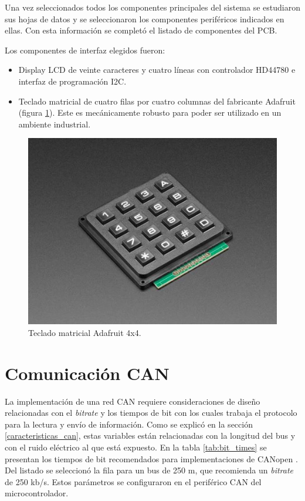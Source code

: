 Una vez seleccionados todos los componentes principales del sistema se estudiaron sus hojas de datos y se seleccionaron los componentes periféricos indicados en ellas. Con esta información se completó el listado de componentes del PCB.

Los componentes de interfaz elegidos fueron:
\begin{itemize}
	\item Display LCD de veinte caracteres y cuatro líneas con controlador HD44780 e interfaz de programación I2C. 
	\item Teclado matricial de cuatro filas por cuatro columnas del fabricante Adafruit \citep{web_adafruit} (figura \ref{fig:keypad}). Este es mecánicamente robusto para poder ser utilizado en un ambiente industrial. 
\end{itemize}

\begin{figure}[htbp]
	\centering
	\includegraphics[scale=.8]{./Figures/keypad.JPG}
	\caption{Teclado matricial Adafruit 4x4.}
	\label{fig:keypad}
\end{figure}



\section{Comunicación CAN}
\label{comunicacion_can}

La implementación de una red CAN requiere consideraciones de diseño relacionadas con el \textit{bitrate} y los tiempos de bit con los cuales trabaja el protocolo para la lectura y envío de información. Como se explicó en la sección \ref{caracteristicas_can}, estas variables están relacionadas con la longitud del bus y con el ruido eléctrico al que está expuesto. En la tabla \ref{tab:bit_times} se presentan los tiempos de bit recomendados para implementaciones de CANopen \citep{UnderstandingCAN}. Del listado se seleccionó la fila para un bus de 250 m, que recomienda un \textit{bitrate} de 250 kb/s. Estos parámetros se configuraron en el periférico CAN del microcontrolador.

